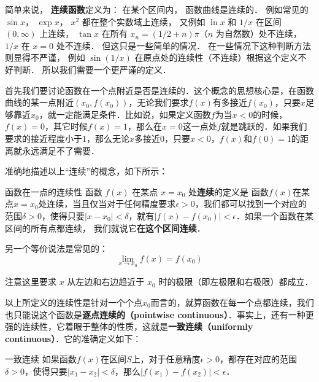 

简单来说， \textbf{连续函数}定义为： 在某个区间内， 函数曲线是连续的． 例如常见的 $\sin x$， $\exp x$， $x^2$ 都在整个实数域上连续， 又例如 $\ln x$ 和 $1/x$ 在区间 $(0, \infty)$ 上连续， $\tan x$ 在所有 $x_n = (1/2 + n)\pi$（$n$ 为自然数）处不连续， $1/x$ 在 $x = 0$ 处不连续． 但这只是一些简单的情况． 在一些情况下这种判断方法则显得不严谨， 例如 $\sin(1/x)$ 在原点处的连续性（不连续）根据这个定义不好判断． 所以我们需要一个更严谨的定义．

首先我们要讨论函数在一个点附近是否是连续的．这个概念的思想核心是，在函数曲线的某一点附近$(x_0, f(x_0))$，无论我们要求$f(x)$有多接近$f(x_0)$，只要$x$足够靠近$x_0$，就一定能满足条件．比如说，如果定义函数$f$为当$x<0$的时候，$f(x)=0$，其它时候$f(x)=1$，那么在$x=0$这一点处$f$就是跳跃的．如果我们要求的接近程度小于$1$，那么无论$x$多接近$0$，只要$x<0$，$f(x)$和$f(0)=1$的距离就永远满足不了需要．

准确地描述以上“连续”的概念，如下所示：

\begin{definition}{函数在一点的连续性}
函数 $f(x)$ 在某点 $x = x_0$ 处\textbf{连续}的定义是
函数$f(x)$在某点$x=x_0$处连续，当且仅当对于任何精度要求$\epsilon>0$，我们都可以找到一个对应的范围$\delta>0$，使得只要$|x-x_0|<\delta$，就有$|f(x)-f(x_0)|<\epsilon$．如果一个函数在某区间的所有点都连续， 我们就说它\textbf{在这个区间连续}．

另一个等价说法是常见的：
\begin{equation}
\lim_{x \to x_0} f(x) = f(x_0)
\end{equation}
\end{definition}

注意这里要求 $x$ 从左边和右边趋近于 $x_0$ 时的极限（即左极限和右极限）都成立． %

以上所定义的连续性是针对一个个点$x_0$而言的，就算函数在每一个点都连续，我们也只能说这个函数是\textbf{逐点连续的（pointwise continuous）}．事实上，还有一种更强的连续性，它着眼于整体的性质，这就是\textbf{一致连续（uniformly continuous）}．它的准确定义如下：

\begin{definition}{一致连续}
如果函数$f(x)$在区间$S$上，对于任意精度$\epsilon>0$，都存在对应的范围$\delta>0$，使得只要$|x_1-x_2|<\delta$，那么$|f(x_1)-f(x_2)|<\epsilon$．

\end{definition}

